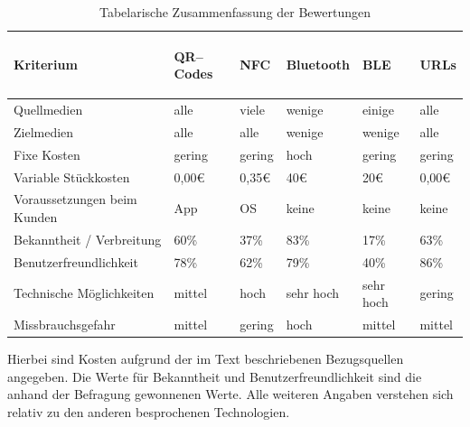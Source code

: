 \begin{table}[H]
\begin{center}
\begin{footnotesize}
\begin{tabular}{| l | C{1cm} | C{1cm} | C{1cm} | C{1cm} | C{1cm} |}  \hline                       
  \textbf{Kriterium} & 
	\begin{turn}{90}\textbf{QR–Codes\hspace{0.1cm}}\end{turn} & 
	\begin{turn}{90}\textbf{NFC}\end{turn}  & 
	\begin{turn}{90}\textbf{Bluetooth}\end{turn} & 
	\begin{turn}{90}\textbf{BLE}\end{turn} & 
	\begin{turn}{90}\textbf{URLs}\end{turn}\\ \hline 
	Quellmedien					& alle   & viele   & wenige & einige   & alle \\  \hline  
	Zielmedien  				& alle   & alle    & wenige & wenige   & alle \\  \hline  
	Fixe Kosten 				& gering & gering  & hoch   & gering   & gering \\  \hline  
	Variable Stückkosten		& 0,00€  & 0,35€ & 40€  & 20€ & 0,00€ \\  \hline  
	Voraussetzungen beim Kunden & App    & OS      & keine  & keine    & keine \\  \hline  
	Bekanntheit / Verbreitung	& 60\%   & 37\%    & 83\%   & 17\%     & 63\% \\  \hline  
	Benutzerfreundlichkeit 		& 78\%   & 62\%    & 79\%   & 40\%     & 86\% \\  \hline  
	Technische Möglichkeiten   & mittel & hoch    & sehr hoch & sehr hoch & gering \\ \hline
	Missbrauchsgefahr 			& mittel & gering  & hoch   & mittel   & mittel \\  \hline  
			   
\end{tabular}
\end{footnotesize}
\caption{Tabelarische Zusammenfassung der Bewertungen}
\label{tab:zusammenfassung}
\end{center}
\end{table}

Hierbei sind Kosten aufgrund der im Text beschriebenen Bezugsquellen angegeben. Die Werte für Bekanntheit und Benutzerfreundlichkeit sind die anhand der Befragung gewonnenen Werte. Alle weiteren Angaben verstehen sich relativ zu den anderen besprochenen Technologien.

